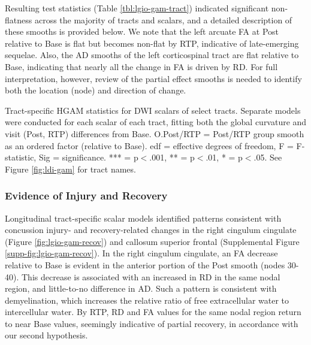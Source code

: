 \documentclass[12pt]{article}
\begin{document}
Resulting test statistics (Table \ref{tbl:lgio-gam-tract}) indicated significant non-flatness across the majority of tracts and scalars, and a detailed description of these smooths is provided below. We note that the left arcuate FA at Post relative to Base is flat but becomes non-flat by RTP, indicative of late-emerging sequelae. Also, the AD smooths of the left corticospinal tract are flat relative to Base, indicating that nearly all the change in FA is driven by RD. For full interpretation, however, review of the partial effect smooths is needed to identify both the location (node) and direction of change.

\begin{table}[H]
	\tiny
	
	\caption{Tract-specific HGAM statistics for DWI scalars of select tracts. Separate models were conducted for each scalar of each tract, fitting both the global curvature and visit (Post, RTP) differences from Base. O.Post/RTP = Post/RTP group smooth as an ordered factor (relative to Base). edf = effective degrees of freedom, F = F-statistic, Sig = significance. *** = p$<$.001, ** = p$<$.01, * = p$<$.05. See Figure \ref{fig:ldi-gam} for tract names.}
	\label{tbl:lgio-gam-tract}
\end{table}


\subsubsection{Evidence of Injury and Recovery}
\label{sssec:res-dwi-pat-recov}
Longitudinal tract-specific scalar models identified patterns consistent with concussion injury- and recovery-related changes in the right cingulum cingulate (Figure \ref{fig:lgio-gam-recov}) and callosum superior frontal (Supplemental Figure \ref{supp-fig:lgio-gam-recov}). In the right cingulum cingulate, an FA decrease relative to Base is evident in the anterior portion of the Post smooth (nodes 30-40). This decrease is associated with an increased in RD in the same nodal region, and little-to-no difference in AD. Such a pattern is consistent with demyelination, which increases the relative ratio of free extracellular water to intercellular water. By RTP, RD and FA values for the same nodal region return to near Base values, seemingly indicative of partial recovery, in accordance with our second hypothesis.
\end{document}
